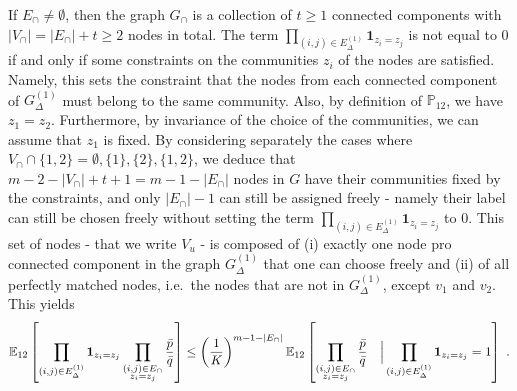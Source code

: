 \documentclass[final]{colt2026}
\newcommand{\1}{\mathbf{1}}
\newcommand{\bbE}{\mathbb{E}}
\newcommand{\cro}[1]{\left[#1\right]}
\begin{document}
If $E_{\cap}\neq \emptyset$, then the graph $G_{\cap}$ is a collection of $t\geq 1$ connected components with $|V_{\cap}|=|E_{\cap}|+t \geq 2$ nodes in total. 
The term $\prod_{(i,j)\in E^{(1)}_{\Delta} }\mathbf 1_{z_{i}=z_{j}}$ is not equal to $0$ if and only if some constraints on the communities $z_i$ of the nodes  are satisfied. Namely, this sets the constraint that the nodes from each connected component of $G_\Delta^{(1)}$  must belong to the same community. Also, by definition of $\mathbb{P}_{12}$, we have $z_1=z_2$. Furthermore, by invariance of the choice of the communities, we can assume that $z_1$ is fixed. By considering separately the cases where $V_{\cap}\cap \{1,2\}=\emptyset, \{1\}, \{2\}, \{1,2\}$, we deduce that $m-2-|V_{\cap}|+t+1= m-1-|E_{\cap}|$ nodes in $G$ have their communities fixed by the constraints, and only $|E_{\cap}|-1$ can still be assigned freely - namely their label can still be chosen freely without setting the term $\prod_{(i,j)\in E^{(1)}_{\Delta} }\mathbf 1_{z_{i}=z_{j}}$ to $0$. This set of nodes - that we write $V_u$ - is composed of (i) exactly one node pro connected component in the graph $G_\Delta^{(1)}$  that one can choose freely and (ii) of all perfectly matched nodes, i.e.~the nodes that are not in $G_\Delta^{(1)}$, except $v_1$ and $v_2$. This yields
\[
\bbE_{12}\cro{\prod_{(i,j)\in E^{(1)}_{\Delta} }\mathbf 1_{z_{i}=z_{j}}\prod_{\substack{(i,j)\in E_{\cap}\\ z_{i}=z_{j}}}{\bar p\over \bar q}}\leq
\left(\frac{1}{K}\right)^{m-1-|E_{\cap}|}\mathbb{E}_{12}\left[\prod_{\substack{(i,j)\in E_{\cap}\\ z_{i}=z_{j}}}{\bar p\over \bar q}~~~\Big| \prod_{(i,j)\in E^{(1)}_{\Delta} }\mathbf 1_{z_{i}=z_{j}} = 1\right]\ .
\]
\end{document}
